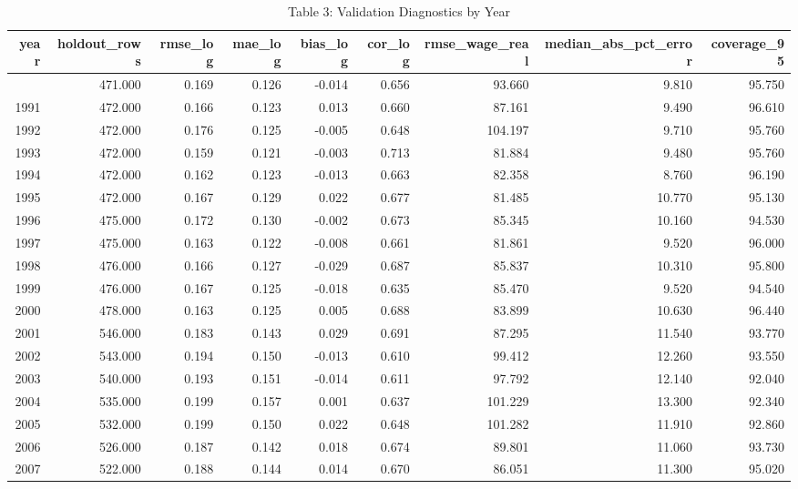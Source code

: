 \begin{table}[t]
\caption*{
{\fontsize{20}{25}\selectfont  Table 3: Validation Diagnostics by Year\fontsize{12}{15}\selectfont }
} 
\fontsize{12.0pt}{14.0pt}\selectfont
\begin{tabular*}{\linewidth}{@{\extracolsep{\fill}}rrrrrrrrr}
\toprule
year & holdout\_rows & rmse\_log & mae\_log & bias\_log & cor\_log & rmse\_wage\_real & median\_abs\_pct\_error & coverage\_95 \\ 
\midrule\addlinespace[2.5pt]
1990 & 471.000 & 0.169 & 0.126 & -0.014 & 0.656 & 93.660 & 9.810 & 95.750 \\ 
1991 & 472.000 & 0.166 & 0.123 & 0.013 & 0.660 & 87.161 & 9.490 & 96.610 \\ 
1992 & 472.000 & 0.176 & 0.125 & -0.005 & 0.648 & 104.197 & 9.710 & 95.760 \\ 
1993 & 472.000 & 0.159 & 0.121 & -0.003 & 0.713 & 81.884 & 9.480 & 95.760 \\ 
1994 & 472.000 & 0.162 & 0.123 & -0.013 & 0.663 & 82.358 & 8.760 & 96.190 \\ 
1995 & 472.000 & 0.167 & 0.129 & 0.022 & 0.677 & 81.485 & 10.770 & 95.130 \\ 
1996 & 475.000 & 0.172 & 0.130 & -0.002 & 0.673 & 85.345 & 10.160 & 94.530 \\ 
1997 & 475.000 & 0.163 & 0.122 & -0.008 & 0.661 & 81.861 & 9.520 & 96.000 \\ 
1998 & 476.000 & 0.166 & 0.127 & -0.029 & 0.687 & 85.837 & 10.310 & 95.800 \\ 
1999 & 476.000 & 0.167 & 0.125 & -0.018 & 0.635 & 85.470 & 9.520 & 94.540 \\ 
2000 & 478.000 & 0.163 & 0.125 & 0.005 & 0.688 & 83.899 & 10.630 & 96.440 \\ 
2001 & 546.000 & 0.183 & 0.143 & 0.029 & 0.691 & 87.295 & 11.540 & 93.770 \\ 
2002 & 543.000 & 0.194 & 0.150 & -0.013 & 0.610 & 99.412 & 12.260 & 93.550 \\ 
2003 & 540.000 & 0.193 & 0.151 & -0.014 & 0.611 & 97.792 & 12.140 & 92.040 \\ 
2004 & 535.000 & 0.199 & 0.157 & 0.001 & 0.637 & 101.229 & 13.300 & 92.340 \\ 
2005 & 532.000 & 0.199 & 0.150 & 0.022 & 0.648 & 101.282 & 11.910 & 92.860 \\ 
2006 & 526.000 & 0.187 & 0.142 & 0.018 & 0.674 & 89.801 & 11.060 & 93.730 \\ 
2007 & 522.000 & 0.188 & 0.144 & 0.014 & 0.670 & 86.051 & 11.300 & 95.020 \\ 

\end{tabular*}
\end{table}
